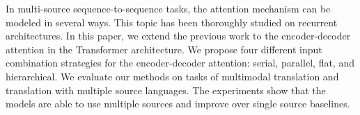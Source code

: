 In multi-source sequence-to-sequence tasks, the attention mechanism can be modeled in several ways. This topic has been thoroughly studied on recurrent architectures. In this paper, we extend the previous work to the encoder-decoder attention in the Transformer architecture. We propose four different input combination strategies for the encoder-decoder attention: serial, parallel, flat, and hierarchical. We evaluate our methods on tasks of multimodal translation and translation with multiple source languages. The experiments show that the models are able to use multiple sources and improve over single source baselines.
